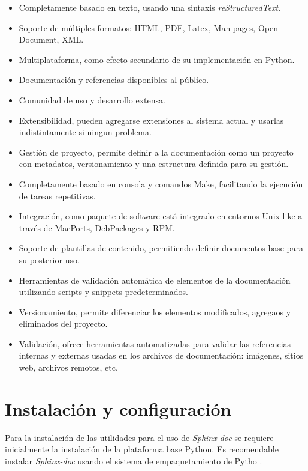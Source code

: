 \documentclass{sig-alternate}
\begin{document}
  \begin{itemize}
   	\item Completamente basado en texto, usando una sintaxis \emph{reStructuredText}.
   	\item Soporte de m\'ultiples formatos:
    	HTML, PDF, Latex, Man pages, Open Document, XML. 
   	\item Multiplataforma, como efecto secundario de su implementaci\'on 
    	en Python.
   	\item Documentaci\'on y referencias disponibles al p\'ublico.
   	\item Comunidad de uso y desarrollo extensa.
	\item Extensibilidad, pueden agregarse extensiones al sistema
	    actual y usarlas indistintamente si ningun problema.
	\item Gesti\'on de proyecto, permite definir a la documentaci\'on
	    como un proyecto con metadatos, versionamiento y una estructura
	    definida para su gesti\'on.
	\item Completamente basado en consola y comandos Make, facilitando
	    la ejecuci\'on de tareas repetitivas.
	\item Integraci\'on, como paquete de software est\'a integrado 
	    en entornos Unix-like a trav\'es de MacPorts, DebPackages y 
	    RPM.
	\item Soporte de plantillas de contenido, permitiendo definir 
	    documentos base para su posterior uso.
	\item Herramientas de validaci\'on autom\'atica de elementos 
	    de la documentaci\'on utilizando scripts y snippets 
	    predeterminados.
	\item Versionamiento, permite diferenciar los elementos modificados,
	    agregaos y eliminados del proyecto.
	\item Validaci\'on, ofrece herramientas automatizadas para validar
	    las referencias internas y externas usadas en los archivos
	    de documentaci\'on: im\'agenes, sitios web, archivos remotos, etc.
  \end{itemize}
  
\section{Instalaci\'on y configuraci\'on}

	Para la instalaci\'on de las utilidades para el uso de \emph{Sphinx-doc} 
	se requiere inicialmente la instalaci\'on de la plataforma base
	Python. Es recomendable instalar \emph{Sphinx-doc} usando el sistema 
	de empaquetamiento de Pytho \cite{sphinx2}.
	
\end{document}
